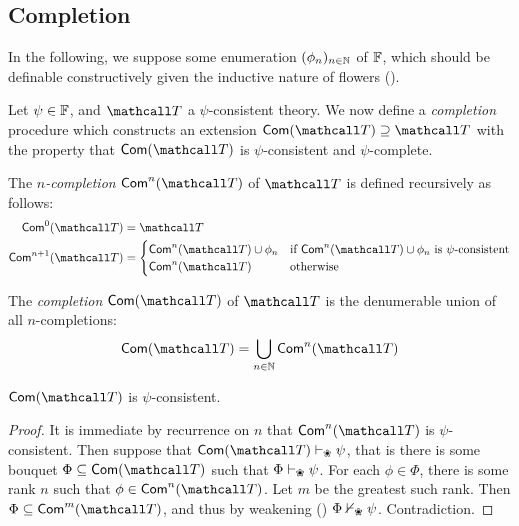 \subsection{Completion}

In the following, we suppose some enumeration $(\phi_n)_{n \in \mathbb{N}}$ of
$\mathbb{F}$, which should be definable constructively given the
inductive nature of flowers ().

Let $\psi \in \mathbb{F}$, and $\tT$ a $\psi$-consistent theory. We now
define a \emph{completion} procedure which constructs an extension
$\completion{\tT} \supseteq \tT$ with the property that $\completion{\tT}$ is
$\psi$-consistent and $\psi$-complete.

\begin{definition}[$n$-completion]
  The \emph{$n$-completion} $\ncompletion{\tT}{n}$ of $\tT$ is defined recursively
  as follows:
  \begin{align*}
    \ncompletion{\tT}{0} &= \tT \\
    \ncompletion{\tT}{n+1} &=
    \begin{cases}
      \ncompletion{\tT}{n} \cup \phi_n &\text{if $\ncompletion{\tT}{n} \cup \phi_n$ is $\psi$-consistent} \\
      \ncompletion{\tT}{n} &\text{otherwise}
    \end{cases}
  \end{align*}
\end{definition}

\begin{definition}[Completion]
  The \emph{completion} $\completion{\tT}$ of $\tT$ is the denumerable union of all
  $n$-completions:
  $$\completion{\tT} = \bigcup_{n \in \nats}{\ncompletion{\tT}{n}}$$
\end{definition}

\begin{lemma}
  $\completion{\tT}$ is $\psi$-consistent.
\end{lemma}
\begin{proof}
  It is immediate by recurrence on $n$ that $\ncompletion{\tT}{n}$ is
  $\psi$-consistent. Then suppose that $\completion{\tT} \vdash_\Nature \psi$,
  that is there is some bouquet $\Phi \subseteq \completion{\tT}$ such that $\Phi
  \vdash_\Nature \psi$. For each $\phi \in \Phi$, there is some rank $n$ such
  that $\phi \in \ncompletion{\tT}{n}$. Let $m$ be the greatest such rank. Then
  $\Phi \subseteq \ncompletion{\tT}{m}$, and thus by weakening
  () $\Phi \nvdash_\Nature \psi$. Contradiction.
\end{proof}


